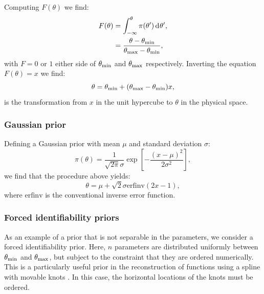 Computing \(F(\theta)\) we find:
\begin{align}
  F(\theta) &= \int_{-\infty}^\theta \pi(\theta^\prime)\operatorname{d}^{}\!{\theta^\prime}, \nonumber\\
  &= \frac{\theta-\theta_{\mathrm{min}}}{\theta_{\mathrm{max}}-\theta_{\mathrm{min}}},
  \label{eqn:pc:calc_uniform_trans}
\end{align}
with \(F=0\) or \(1\) either side of \(\theta_{\mathrm{min}}\) and \(\theta_{\mathrm{max}}\) respectively. Inverting the equation \(F(\theta)=x\) we find:
\begin{equation}
  \theta = \theta_{\mathrm{min}}+(\theta_{\mathrm{max}}-\theta_{\mathrm{min}})x,
  \label{eqn:pc:uniform_trans}                           
\end{equation}
is the transformation from \(x\) in the unit hypercube to \(\theta\) in the physical space.

\subsubsection{Gaussian prior}
\label{sec:pc:gaussian_prior}
Defining a Gaussian prior with mean \(\mu\) and standard deviation \(\sigma\):
\begin{equation}
  \pi(\theta) = \frac{1}{\sqrt{2\pi}\sigma}\exp{\left[-\frac{{(x-\mu)}^2}{2\sigma^2}\right]},
  \label{eqn:pc:gaussian_prior}
\end{equation}
we find that the procedure above yields:
\begin{equation}
  \theta = \mu + \sqrt{2}\sigma\text{erfinv}(2x-1),
  \label{eqn:pc:gaussian_trans}                           
\end{equation}
where \(\text{erfinv}\) is the conventional inverse error function.




\subsubsection{Forced identifiability priors}
\label{sec:pc:forced_identifiablility}

As an example of a prior that is not separable in the parameters, we consider a forced identifiability prior. Here, \(n\) parameters are distributed uniformly between \(\theta_{\mathrm{min}}\) and \(\theta_{\mathrm{max}}\), but subject to the constraint that they are ordered numerically. This is a particularly useful prior in the reconstruction of functions using a spline with movable knots \citep{vazquez_knots,knottedsky1,knottedsky2,planck2015-a24}. In this case, the  horizontal locations of the knots must be ordered.

